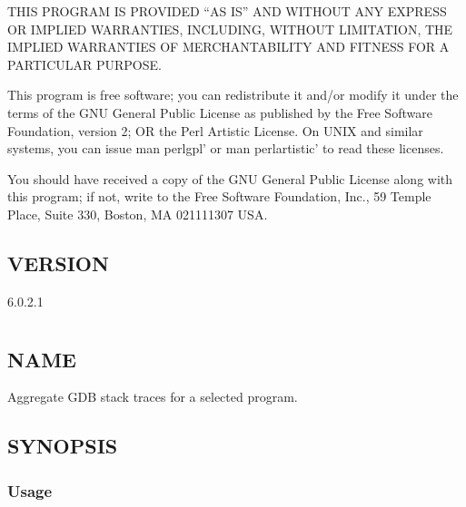 \documentclass[letterpaper,10pt,english]{sphinxmanual}
\begin{document}
THIS PROGRAM IS PROVIDED “AS IS” AND WITHOUT ANY EXPRESS OR IMPLIED
WARRANTIES, INCLUDING, WITHOUT LIMITATION, THE IMPLIED WARRANTIES OF
MERCHANTABILITY AND FITNESS FOR A PARTICULAR PURPOSE.

This program is free software; you can redistribute it and/or modify it under
the terms of the GNU General Public License as published by the Free Software
Foundation, version 2; OR the Perl Artistic License.  On UNIX and similar
systems, you can issue \textasciigrave{}man perlgpl’ or \textasciigrave{}man perlartistic’ to read these
licenses.

You should have received a copy of the GNU General Public License along with
this program; if not, write to the Free Software Foundation, Inc., 59 Temple
Place, Suite 330, Boston, MA  02111\sphinxhyphen{}1307  USA.


\section{VERSION}
\label{\detokenize{mariadb-schema-change:version}}
 6.0.2.1


\chapter{}
\label{\detokenize{mariadb-stacktrace:mariadb-stacktrace}}\label{\detokenize{mariadb-stacktrace::doc}}

\section{NAME}
\label{\detokenize{mariadb-stacktrace:name}}
 \sphinxhyphen{} Aggregate GDB stack traces for a selected program.


\section{SYNOPSIS}
\label{\detokenize{mariadb-stacktrace:synopsis}}

\subsection{Usage}
\label{\detokenize{mariadb-stacktrace:usage}}
\begin{sphinxVerbatim}[commandchars=\\\{\}]
 \PYG{p}{[}\PYG{p}{]} \PYG{p}{[}\PYG{p}{]}
\end{sphinxVerbatim}
\end{document}

